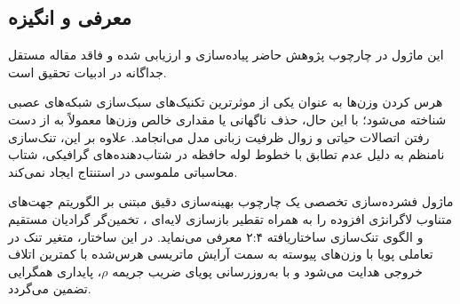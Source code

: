 \subsection{معرفی و انگیزه}
این ماژول در چارچوب پژوهش حاضر پیاده‌سازی و ارزیابی شده و فاقد مقاله مستقل جداگانه در ادبیات تحقیق است.

هرس کردن وزن‌ها  به عنوان یکی از موثرترین تکنیک‌های سبک‌سازی شبکه‌های عصبی شناخته می‌شود؛ با این حال، حذف ناگهانی یا مقداری خالص وزن‌ها  معمولاً به از دست رفتن اتصالات حیاتی و زوال ظرفیت زبانی مدل می‌انجامد. علاوه بر این، تنک‌سازی نامنظم  به دلیل عدم تطابق با خطوط لوله حافظه در شتاب‌دهنده‌های گرافیکی، شتاب محاسباتی ملموسی در استنتاج ایجاد نمی‌کند.

ماژول فشرده‌سازی تخصصی  یک چارچوب بهینه‌سازی دقیق مبتنی بر الگوریتم جهت‌های متناوب لاگرانژی افزوده  را به همراه تقطیر بازسازی لایه‌ای ، تخمین‌گر گرادیان مستقیم  و الگوی تنک‌سازی ساختاریافته ۲:۴ معرفی می‌نماید. در این ساختار، متغیر تنک در تعاملی پویا با وزن‌های پیوسته به سمت آرایش ماتریسی هرس‌شده با کمترین اتلاف خروجی هدایت می‌شود و با به‌روزرسانی پویای ضریب جریمه $\rho$، پایداری همگرایی تضمین می‌گردد.
